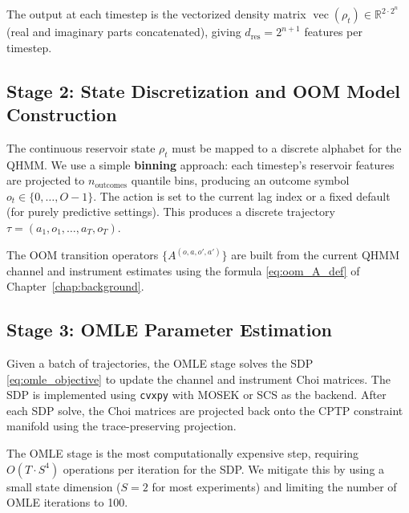 
The output at each timestep is the vectorized density matrix
$\operatorname{vec}(\rho_t) \in \mathbb{R}^{2 \cdot 2^n}$ (real and
imaginary parts concatenated), giving $d_{\mathrm{res}} = 2^{n+1}$
features per timestep.


\subsection*{Stage 2: State Discretization and OOM Model Construction}

The continuous reservoir state $\rho_t$ must be mapped to a discrete
alphabet for the QHMM. We use a simple \textbf{binning} approach: each
timestep's reservoir features are projected to $n_{\mathrm{outcomes}}$
quantile bins, producing an outcome symbol $o_t \in \{0,\ldots,O-1\}$.
The action is set to the current lag index or a fixed default (for
purely predictive settings). This produces a discrete trajectory
$\tau = (a_1,o_1, \ldots, a_T,o_T)$.


The OOM transition operators $\{A^{(o,a,o',a')}\}$ are built from the
current QHMM channel and instrument estimates using the formula
\eqref{eq:oom_A_def} of Chapter~\ref{chap:background}.


\subsection*{Stage 3: OMLE Parameter Estimation}

Given a batch of trajectories, the OMLE stage solves the SDP
\eqref{eq:omle_objective} to update the channel and instrument Choi
matrices. The SDP is implemented using \verb|cvxpy| with MOSEK or SCS as
the backend. After each SDP solve, the Choi matrices are projected back
onto the CPTP constraint manifold using the trace-preserving projection.


The OMLE stage is the most computationally expensive step, requiring
$O(T \cdot S^4)$ operations per iteration for the SDP. We mitigate this
by using a small state dimension ($S=2$ for most experiments) and
limiting the number of OMLE iterations to 100.

